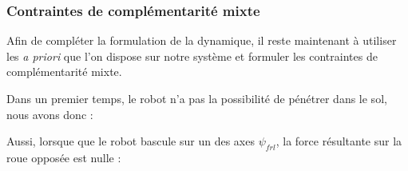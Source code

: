 					
			\subsubsection{Contraintes de complémentarité mixte}
			
				Afin de compléter la formulation de la dynamique, il reste maintenant à utiliser les \textit{a priori} que l'on dispose sur notre système et formuler les contraintes de complémentarité mixte.
				
				Dans un premier temps, le robot n'a pas la possibilité de pénétrer dans le sol, nous avons donc :
				
				Aussi, lorsque que le robot bascule sur un des axes $\psi_{frl}$, la force résultante sur la roue opposée est nulle :
				
